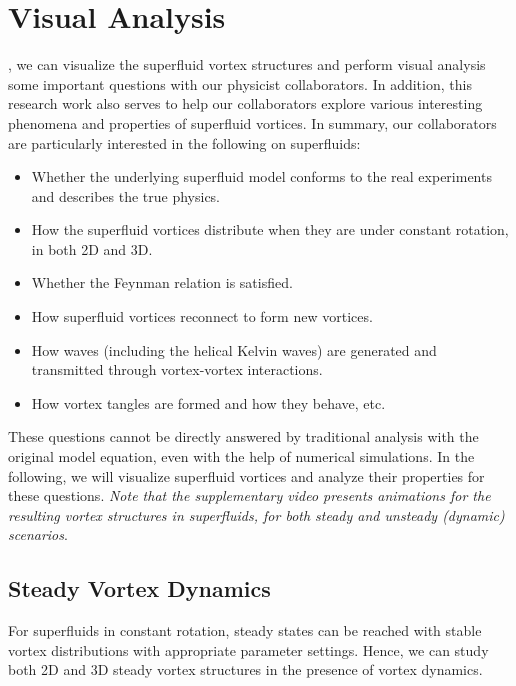 \documentclass[10pt,journal,compsoc,twoside]{IEEEtran}
\newcommand{\rd}[1]{{\color[rgb]{0.0,0.0,0.0}{#1}}}
\newcommand{\bl}[1]{{\color{black}{#1}}}
\begin{document}
	
	\section{Visual Analysis}
	\label{sec:visual_analysis}
	
	\bl{Once we identify the vortex cores and extract the vortex tubes around}, we can \bl{render the vortex tubes in order to} visualize the superfluid vortex structures and perform visual analysis \rd{to answer} some important questions with our physicist collaborators.
	In addition, this research work also serves to help our collaborators explore various interesting phenomena and properties of superfluid vortices.
	In summary, our collaborators are particularly interested in the following \rd{questions} on superfluids:
		\begin{itemize}
			\item{Whether the underlying superfluid model conforms to the real experiments and describes the true physics.}
			\item{How the superfluid vortices distribute when they are under constant rotation, in both 2D and 3D.}
			\item{Whether the Feynman relation is satisfied.}
			\item{How superfluid vortices reconnect to form new vortices.}
			\item{How waves (including the helical Kelvin waves) are generated and transmitted through vortex-vortex interactions.}
			\item{How vortex tangles are formed and how they behave, etc.}
		\end{itemize}
	These questions cannot be directly answered by traditional analysis with the original model equation, even with the help of numerical simulations.
	In the following, we will visualize superfluid vortices and analyze their properties for these questions.
	\textit{Note that the supplementary video presents animations for the resulting vortex structures in superfluids, for both steady and unsteady (dynamic) scenarios}.
	
	
	

	\subsection{Steady Vortex Dynamics}
	\label{sec:steady_vortex_dyanmics}
	
	For superfluids in constant rotation, steady states can be reached with stable vortex distributions with appropriate parameter settings.
	Hence, we can study both 2D and 3D steady vortex structures in the presence of vortex dynamics.
	
\end{document}
